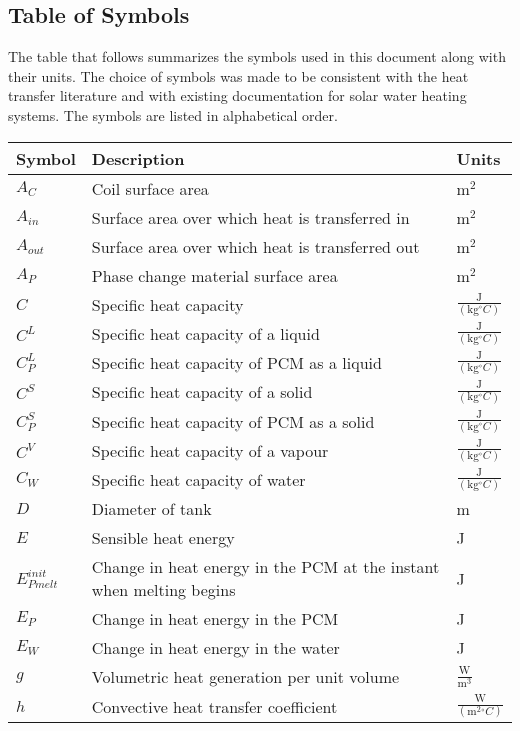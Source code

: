 \documentclass[12pt]{article}
\begin{document}
\subsection{Table of Symbols}
\label{Sec:ToS}
The table that follows summarizes the symbols used in this document along with their units. The choice of symbols was made to be consistent with the heat transfer literature and with existing documentation for solar water heating systems. The symbols are listed in alphabetical order.
\begin{longtable*}{l l l}
\toprule
Symbol & Description & Units
\\
\midrule
$A_{C}$ & Coil surface area & $\text{m}^{2}$
\\
$A_{in}$ & Surface area over which heat is transferred in & $\text{m}^{2}$
\\
$A_{out}$ & Surface area over which heat is transferred out & $\text{m}^{2}$
\\
$A_{P}$ & Phase change material surface area & $\text{m}^{2}$
\\
$C$ & Specific heat capacity & $\frac{\text{J}}{(\text{kg}{}^{\circ}C)}$
\\
$C^{L}$ & Specific heat capacity of a liquid & $\frac{\text{J}}{(\text{kg}{}^{\circ}C)}$
\\
$C_{P}^{L}$ & Specific heat capacity of PCM as a liquid & $\frac{\text{J}}{(\text{kg}{}^{\circ}C)}$
\\
$C^{S}$ & Specific heat capacity of a solid & $\frac{\text{J}}{(\text{kg}{}^{\circ}C)}$
\\
$C_{P}^{S}$ & Specific heat capacity of PCM as a solid & $\frac{\text{J}}{(\text{kg}{}^{\circ}C)}$
\\
$C^{V}$ & Specific heat capacity of a vapour & $\frac{\text{J}}{(\text{kg}{}^{\circ}C)}$
\\
$C_{W}$ & Specific heat capacity of water & $\frac{\text{J}}{(\text{kg}{}^{\circ}C)}$
\\
$D$ & Diameter of tank & m
\\
$E$ & Sensible heat energy & J
\\
$E_{Pmelt}^{init}$ & Change in heat energy in the PCM at the instant when melting begins & J
\\
$E_{P}$ & Change in heat energy in the PCM & J
\\
$E_{W}$ & Change in heat energy in the water & J
\\
$g$ & Volumetric heat generation per unit volume & $\frac{\text{W}}{\text{m}^{3}}$
\\
$h$ & Convective heat transfer coefficient & $\frac{\text{W}}{(\text{m}^{2}{}^{\circ}C)}$

\end{longtable*}
\end{document}
